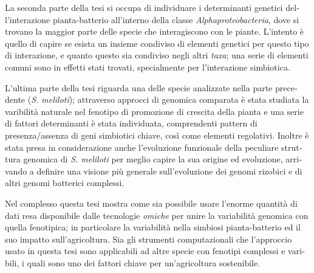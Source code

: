 \begin{otherlanguage}{italian}
La seconda parte della tesi si occupa di individuare i determinanti genetici dell'interazione pianta-batterio all'interno della classe \textit{Alphaproteobacteria}, dove si trovano la maggior parte delle specie che interagiscono con le piante. L'intento è quello di capire se esista un insieme condiviso di elementi genetici per questo tipo di interazione, e quanto questo sia condiviso negli altri \textit{taxa}; una serie di elementi comuni sono in effetti stati trovati, specialmente per l'interazione simbiotica.

L'ultima parte della tesi riguarda una delle specie analizzate nella parte precedente (\textit{S. meliloti}); attraverso approcci di genomica comparata è stata studiata la varibilità naturale nel fenotipo di promozione di crescita della pianta e una serie di fattori determinanti è stata individuata, comprendenti pattern di presenza/assenza di geni simbiotici chiave, così come elementi regolativi. Inoltre è stata presa in considerazione anche l'evoluzione funzionale della peculiare struttura genomica di \textit{S. meliloti} per meglio capire la sua origine ed evoluzione, arrivando a definire una visione più generale sull'evoluzione dei genomi rizobici e di altri genomi batterici complessi.

Nel complesso questa tesi mostra come sia possibile usare l'enorme quantità di dati resa disponibile dalle tecnologie \textit{omiche} per unire la variabilità genomica con quella fenotipica; in particolare la variabilità nella simbiosi pianta-batterio ed il suo impatto sull'agricoltura. Sia gli strumenti computazionali che l'approccio usato in questa tesi sono applicabili ad altre specie con fenotipi complessi e varibili, i quali sono uno dei fattori chiave per un'agricoltura sostenibile.

\end{otherlanguage}